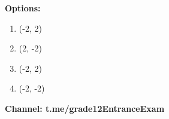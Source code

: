 \documentclass[12pt]{article}
\begin{document}
\begin{preview}
\begin{minipage}{16.5cm}
\par
\par\vspace{1.5em}
\begin{minipage}{15.0cm}
\textbf{Options:} \par \vspace{0.5em} 
\begin{enumerate}[label=\bfseries\Alph*), leftmargin=3em]
\item (-2, 2)
\item (2, -2)
\item (-2, 2)
\item (-2, -2)
\end{enumerate}
\end{minipage}
\par\vspace{1.5em}
\begin{minipage}{15.0cm}
\vspace{0.5em}
\noindent\hrulefill \par
\vspace{0.8em}
\centering \small \color{gray} \textbf{\textsf{Channel: t.me/grade12EntranceExam}}
\end{minipage}
\end{minipage}
\end{preview}
\end{document}
